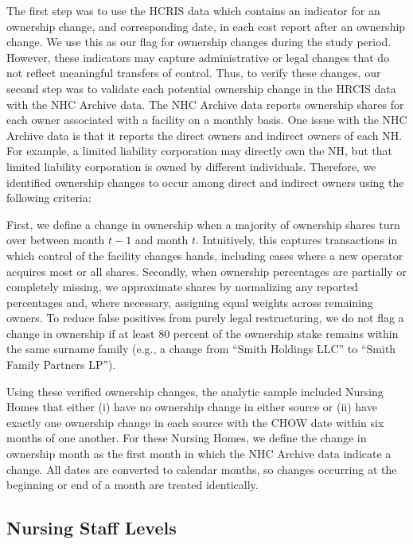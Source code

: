 \documentclass[preprint,authoryear]{elsarticle}
\begin{document}
The first step was to use the HCRIS data which contains an indicator for an ownership change, and corresponding date, in each cost report after an ownership change. We use this as our flag for ownership changes during the study period. However, these indicators may capture administrative or legal changes that do not reflect meaningful transfers of control. Thus, to verify these changes, our second step was to validate each potential ownership change in the HRCIS data with the NHC Archive data. The NHC Archive data reports ownership shares for each owner associated with a facility on a monthly basis. One issue with the NHC Archive data is that it reports the direct owners and indirect owners of each NH. For example, a limited liability corporation may directly own the NH, but that limited liability corporation is owned by different individuals. Therefore, we identified ownership changes to occur among direct and indirect owners using the following criteria: 

First, we define a change in ownership when a majority of ownership shares turn over between month $t-1$ and month $t$. Intuitively, this captures transactions in which control of the facility changes hands, including cases where a new operator acquires most or all shares. Secondly, when ownership percentages are partially or completely missing, we approximate shares by normalizing any reported percentages and, where necessary, assigning equal weights across remaining owners. To reduce false positives from purely legal restructuring, we do not flag a change in ownership if at least 80 percent of the ownership stake remains within the same surname family (e.g., a change from “Smith Holdings LLC” to “Smith Family Partners LP”). 

Using these verified ownership changes, the analytic sample included Nursing Homes that either (i) have no ownership change in either source or (ii) have exactly one ownership change in each source with the CHOW date within six months of one another. For these Nursing Homes, we define the change in ownership month as the first month in which the NHC Archive data indicate a change. All dates are converted to calendar months, so changes occurring at the beginning or end of a month are treated identically. 

\subsection{Nursing Staff Levels}
\end{document}

